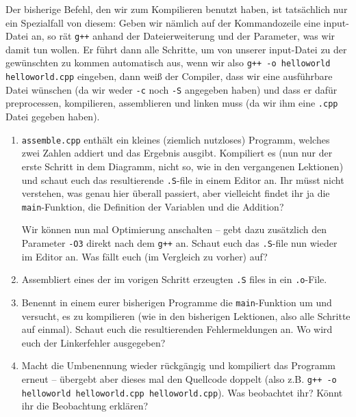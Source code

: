 Der bisherige Befehl, den wir zum Kompilieren benutzt haben, ist tatsächlich
nur ein Spezialfall von diesem: Geben wir nämlich auf der Kommandozeile eine
input-Datei an, so rät \texttt{g++} anhand der Dateierweiterung und der
Parameter, was wir damit tun wollen. Er führt dann alle Schritte, um von
unserer input-Datei zu der gewünschten zu kommen automatisch aus, wenn wir also
\texttt{g++ -o helloworld helloworld.cpp} eingeben, dann weiß der Compiler,
dass wir eine ausführbare Datei wünschen (da wir weder \texttt{-c} noch
\texttt{-S} angegeben haben) und dass er dafür preprocessen, kompilieren, assemblieren und
linken muss (da wir ihm eine \texttt{.cpp} Datei gegeben haben).
\begin{praxis}
	\begin{enumerate}
		\item \texttt{assemble.cpp} enthält ein kleines (ziemlich nutzloses)
		      Programm, welches zwei Zahlen addiert und das Ergebnis ausgibt.
		      Kompiliert es (nun nur der erste Schritt in dem Diagramm, nicht so, wie
		      in den vergangenen Lektionen) und schaut euch das resultierende
		      \texttt{.S}-file in einem Editor an. Ihr müsst nicht verstehen,
		      was genau hier überall passiert, aber vielleicht findet ihr ja die
		      \texttt{main}-Funktion, die Definition der Variablen und die Addition?

		      Wir können nun mal Optimierung anschalten -- gebt dazu zusätzlich den
		      Parameter \texttt{-O3} direkt nach dem \texttt{g++} an. Schaut euch das
		      \texttt{.S}-file nun wieder im Editor an. Was fällt euch
		      (im Vergleich zu vorher) auf?
		\item Assembliert eines der im vorigen Schritt erzeugten \texttt{.S} files
		      in ein \texttt{.o}-File.
		\item Benennt in einem eurer bisherigen Programme die
		      \texttt{main}-Funktion um und versucht, es zu kompilieren (wie in den
		      bisherigen Lektionen, also alle Schritte auf einmal). Schaut euch die
		      resultierenden Fehlermeldungen an. Wo wird euch der Linkerfehler
		      ausgegeben?
		\item Macht die Umbenennung wieder rückgängig und kompiliert das Programm
		      erneut -- übergebt aber dieses mal den Quellcode doppelt (also z.B.
		      \texttt{g++ -o helloworld helloworld.cpp helloworld.cpp}). Was
		      beobachtet ihr? Könnt ihr die Beobachtung erklären?
	\end{enumerate}

\end{praxis}
